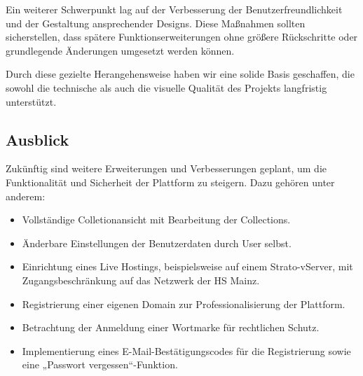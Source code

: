 Ein weiterer Schwerpunkt lag auf der Verbesserung der Benutzerfreundlichkeit und der Gestaltung ansprechender Designs.
Diese Maßnahmen sollten sicherstellen, dass spätere Funktionserweiterungen ohne größere Rückschritte oder grundlegende Änderungen umgesetzt werden können.

Durch diese gezielte Herangehensweise haben wir eine solide Basis geschaffen, die sowohl die technische als auch die visuelle Qualität des Projekts langfristig unterstützt.

\subsection{Ausblick}\label{subsec:ausblick-zukuenftige-ziele-und-funktionen}

Zukünftig sind weitere Erweiterungen und Verbesserungen geplant, um die Funktionalität und Sicherheit der Plattform zu steigern.
Dazu gehören unter anderem:

\begin{itemize}[noitemsep]
    \item Vollständige Colletionansicht mit Bearbeitung der Collections.
    \item Änderbare Einstellungen der Benutzerdaten durch User selbst.
    \item Einrichtung eines Live Hostings, beispielsweise auf einem Strato-vServer, mit Zugangsbeschränkung auf das Netzwerk der HS Mainz.
    \item Registrierung einer eigenen Domain zur Professionalisierung der Plattform.
    \item Betrachtung der Anmeldung einer Wortmarke für rechtlichen Schutz.
    \item Implementierung eines E-Mail-Bestätigungscodes für die Registrierung sowie eine „Passwort vergessen“-Funktion.
\end{itemize}


